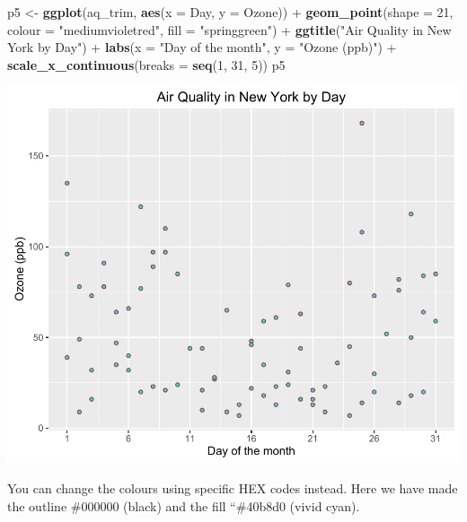 \documentclass[]{article}
\newenvironment{Shaded}{\begin{snugshade}}{\end{snugshade}}
\newcommand{\KeywordTok}[1]{\textcolor[rgb]{0.13,0.29,0.53}{\textbf{{#1}}}}
\newcommand{\DataTypeTok}[1]{\textcolor[rgb]{0.13,0.29,0.53}{{#1}}}
\newcommand{\DecValTok}[1]{\textcolor[rgb]{0.00,0.00,0.81}{{#1}}}
\newcommand{\StringTok}[1]{\textcolor[rgb]{0.31,0.60,0.02}{{#1}}}
\newcommand{\NormalTok}[1]{{#1}}
\begin{document}
\begin{Shaded}
\begin{Highlighting}[]
\NormalTok{p5 <-}\StringTok{ }\KeywordTok{ggplot}\NormalTok{(aq_trim, }\KeywordTok{aes}\NormalTok{(}\DataTypeTok{x =} \NormalTok{Day, }\DataTypeTok{y =} \NormalTok{Ozone)) +}\StringTok{ }
\StringTok{  }\KeywordTok{geom_point}\NormalTok{(}\DataTypeTok{shape =} \DecValTok{21}\NormalTok{, }\DataTypeTok{colour =} \StringTok{"mediumvioletred"}\NormalTok{, }\DataTypeTok{fill =} \StringTok{"springgreen"}\NormalTok{) +}
\StringTok{  }\KeywordTok{ggtitle}\NormalTok{(}\StringTok{"Air Quality in New York by Day"}\NormalTok{) +}\StringTok{ }
\StringTok{  }\KeywordTok{labs}\NormalTok{(}\DataTypeTok{x =} \StringTok{"Day of the month"}\NormalTok{, }\DataTypeTok{y =} \StringTok{"Ozone (ppb)"}\NormalTok{) +}
\StringTok{  }\KeywordTok{scale_x_continuous}\NormalTok{(}\DataTypeTok{breaks =} \KeywordTok{seq}\NormalTok{(}\DecValTok{1}\NormalTok{, }\DecValTok{31}\NormalTok{, }\DecValTok{5}\NormalTok{)) }
\NormalTok{p5}
\end{Highlighting}
\end{Shaded}

\begin{center}\includegraphics{5_Scatter_Plots_pdf/scatter_5-1} \end{center}

You can change the colours using specific HEX codes instead. Here we
have made the outline \#000000 (black) and the fill ``\#40b8d0 (vivid
cyan).
\end{document}
